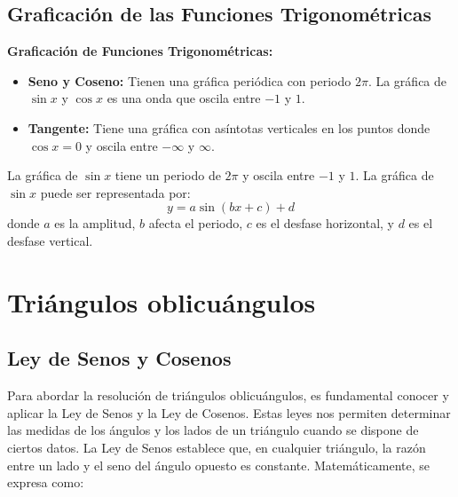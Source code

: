 \subsection{Graficación de las Funciones Trigonométricas}

\begin{definition}
    \textbf{Graficación de Funciones Trigonométricas:}
    \begin{itemize}
        \item \textbf{Seno y Coseno:} Tienen una gráfica periódica con periodo \(2\pi\). La gráfica de \(\sin x\) y \(\cos x\) es una onda que oscila entre \(-1\) y \(1\).
        \item \textbf{Tangente:} Tiene una gráfica con asíntotas verticales en los puntos donde \(\cos x = 0\) y oscila entre \(-\infty\) y \(\infty\).
    \end{itemize}
\end{definition}

\begin{example}
    La gráfica de \(\sin x\) tiene un periodo de \(2\pi\) y oscila entre \(-1\) y \(1\). La gráfica de \(\sin x\) puede ser representada por:
    \[
    y = a \sin(bx + c) + d
    \]
    donde \(a\) es la amplitud, \(b\) afecta el periodo, \(c\) es el desfase horizontal, y \(d\) es el desfase vertical.
\end{example}





\section{Triángulos oblicuángulos} %

\subsection{Ley de Senos y Cosenos}

Para abordar la resolución de triángulos oblicuángulos, es fundamental conocer y aplicar la Ley de Senos y la Ley de Cosenos. Estas leyes nos permiten determinar las medidas de los ángulos y los lados de un triángulo cuando se dispone de ciertos datos. La Ley de Senos establece que, en cualquier triángulo, la razón entre un lado y el seno del ángulo opuesto es constante. Matemáticamente, se expresa como:

